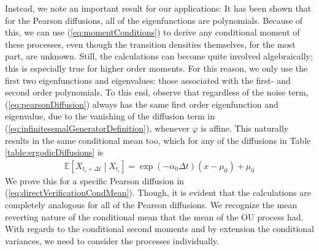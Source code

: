 Instead, we note an important result for our applications: It has been shown \cite{FormanSorensen2008} that for the Pearson diffusions, all of the eigenfunctions are polynomials. Because of this, we can use (\ref{eq:momentConditions}) to derive any conditional moment of these processes, even though the transition densities themselves, for the most part, are unknown. Still, the calculations can become quite involved algebraically; this is especially true for higher order moments. For this reason, we only use the first two eigenfunctions and eigenvalues: those associated with the first- and second order polynomials. To this end, observe that regardless of the noise term, (\ref{eq:pearsonDiffusion}) always has the same first order eigenfunction and eigenvalue, due to the vanishing of the diffusion term in (\ref{eq:infinitesemalGeneratorDefinition}), whenever $\varphi$ is affine. This naturally results in the same conditional mean too, which for any of the diffusions in Table \ref{table:ergodicDiffusions} is
\begin{align}
    \mathbb{E}\left[X_{t_{i}+\Delta t} \middle|X_{t_{i}} \right] = \exp\left(-\alpha_0\Delta t\right)\left(x-\mu_0\right) + \mu_0
\end{align}
We prove this for a specific Pearson diffusion in (\ref{eq:directVerificationCondMean}). Though, it is evident that the calculations are completely analogous for all of the Pearson diffusions. We recognize the mean reverting nature of the conditional mean that the mean of the OU process had. With regards to the conditional second moments and by extension the conditional variances, we need to consider the processes individually.
